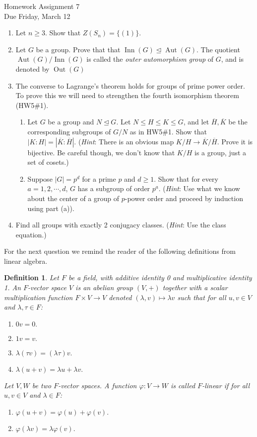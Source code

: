 \documentclass[11pt]{article}
\newtheorem{definition}{Definition}
\newcommand{\Aut}{\operatorname{Aut}}
\newcommand{\Inn}{\operatorname{Inn}}
\newcommand{\Out}{\operatorname{Out}}
\begin{document}
\begin{center}
\Large {Homework Assignment 7}\\
\small {Due Friday, March 12}
\end{center}
\begin{enumerate}
  \item Let $n\ge3$.  Show that $Z(S_n) = \{(1)\}$.
  \item Let $G$ be a group.  Prove that that $\Inn(G)\unlhd\Aut(G)$.  The quotient $\Aut(G)/\Inn(G)$ is called the \textit{outer automorphism group} of $G$, and is denoted by $\Out(G)$
  \item The converse to Lagrange's theorem holds for groups of prime power order.  To prove this we will need to strengthen the fourth isomorphism theorem (HW5\#1).
  \begin{enumerate}
    \item Let $G$ be a group and $N\unlhd G$.  Let $N\le H\le K\le G$, and let $\overline H,\overline K$ be the corresponding subgroups of $G/N$ as in HW5\#1.  Show that $|K:H| = |\overline K:\overline H|$.  (\textit{Hint}: There is an obvious map $K/H\to\overline K/\overline H$.  Prove it is bijective.  Be careful though, we don't know that $K/H$ is a group, just a set of cosets.)
    \item Suppose $|G| = p^d$ for a prime $p$ and $d\ge1$.  Show that for every $a = 1,2,\cdots,d$, $G$ has a subgroup of order $p^a$.  (\textit{Hint}: Use what we know about the center of a group of $p$-power order and proceed by induction using part (a)).
  \end{enumerate}
  \item Find all groups with exactly 2 conjugacy classes.  (\textit{Hint}: Use the class equation.)
\end{enumerate}
For the next question we remind the reader of the following definitions from linear algebra.
\begin{definition}
  Let $F$ be a field, with additive identity 0 and multiplicative identity 1.  An \textit{$F$-vector space} $V$ is an abelian group $(V,+)$ together with a \textit{scalar multiplication function} $F\times V\to V$ denoted $(\lambda,v)\mapsto \lambda v$ such that for all $u,v\in V$ and $\lambda,\tau\in F$:
  \begin{enumerate}[(1)]
    \item $0v = 0.$
    \item $1v = v.$
    \item $\lambda(\tau v) = (\lambda\tau)v.$
    \item $\lambda(u+v) = \lambda u+\lambda v.$
  \end{enumerate}
  Let $V,W$ be two $F$-vector spaces.  A function $\varphi:V\to W$ is called \textit{$F$-linear} if for all $u,v\in V$ and $\lambda\in F$:
  \begin{enumerate}[(1)]
    \item $\varphi(u+v) = \varphi(u) + \varphi(v).$
    \item $\varphi(\lambda v) = \lambda\varphi(v).$
  \end{enumerate}
\end{definition}
\end{document}
